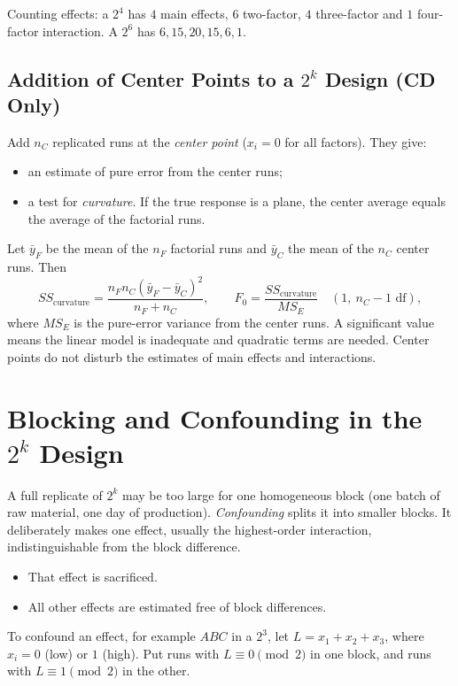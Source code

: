 Counting effects: a $2^4$ has $4$ main effects, $6$ two-factor, $4$ three-factor and $1$ four-factor interaction. A $2^6$ has $6,15,20,15,6,1$.

\subsection{Addition of Center Points to a $2^k$ Design (CD Only)}

Add $n_C$ replicated runs at the \emph{center point} ($x_i=0$ for all factors). They give:
\begin{itemize}
  \item an estimate of pure error from the center runs;
  \item a test for \emph{curvature}. If the true response is a plane, the center average equals the average of the factorial runs.
\end{itemize}
Let $\bar{y}_F$ be the mean of the $n_F$ factorial runs and $\bar{y}_C$ the mean of the $n_C$ center runs. Then
\[ SS_{\text{curvature}}=\frac{n_Fn_C(\bar{y}_F-\bar{y}_C)^2}{n_F+n_C},\qquad F_0=\frac{SS_{\text{curvature}}}{MS_E}\quad(1,\ n_C-1\text{ df}), \]
where $MS_E$ is the pure-error variance from the center runs. A significant value means the linear model is inadequate and quadratic terms are needed. Center points do not disturb the estimates of main effects and interactions.

\section{Blocking and Confounding in the $2^k$ Design}

A full replicate of $2^k$ may be too large for one homogeneous block (one batch of raw material, one day of production). \emph{Confounding} splits it into smaller blocks. It deliberately makes one effect, usually the highest-order interaction, indistinguishable from the block difference.
\begin{itemize}
  \item That effect is sacrificed.
  \item All other effects are estimated free of block differences.
\end{itemize}

\begin{definition}
To confound an effect, for example $ABC$ in a $2^3$, let $L=x_1+x_2+x_3$, where $x_i=0$ (low) or $1$ (high). Put runs with $L\equiv0\pmod2$ in one block, and runs with $L\equiv1\pmod2$ in the other.
\end{definition}

